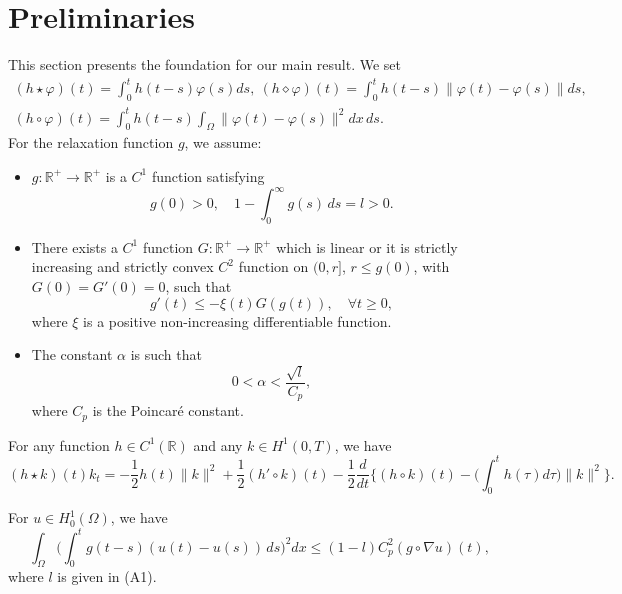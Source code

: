 \documentclass[reqno]{amsart}
\begin{document}
 \section{Preliminaries}

 This section presents the foundation for our main result. We set
 \begin{gather*}
 (h \star \varphi)(t) = \int_0^t h(t-s) \varphi(s)ds,\
 (h \diamond \varphi)(t) = \int_0^t h(t-s)\| \varphi(t)- \varphi(s)\| ds, \\
 (h \circ \varphi)(t) = \int_0^t h(t-s)\int_\Omega\| \varphi(t)- \varphi(s)\|^2 dx \, ds.
 \end{gather*}
 For the relaxation function $g$, we assume:
 \begin{itemize}
\item[(A1)] $g: \mathbb{R}^+ \to \mathbb{R}^+ $ is a $ C^1$ function satisfying\\
\begin{equation*}
 g(0) > 0, \quad 1-\int_0^{\infty} g(s) \, ds = l > 0. \label{e2.1}
\end{equation*}

\item[(A2)] There exists a $C^1$ function $G :\mathbb{R}^+ \to \mathbb{R}^+ $
which is linear or it is strictly increasing and strictly convex $C^2$ function on
$(0, r]$, $r \leq g(0)$, with $G(0) = G'(0) = 0$, such that
\begin{equation} \label{e2.2}
g'(t) \leq -\xi(t) G(g(t)),\quad \forall t \geq 0,
\end{equation}
where $\xi$ is a positive non-increasing differentiable function.

\item[(A3)] The constant $\alpha $ is such that
\begin{equation} \label{e2.3}
0 < \alpha < \frac{\sqrt{l} }{C_p},
\end{equation}
where $C_p$ is the Poincar\'e constant.
\end{itemize}

\begin{lemma} \label{lem1}
For any function $h \in C^1 (\mathbb{R})$ and any $k \in H^1 (0,T)$, we have
$$
(h \star k)(t) k_t
 = -\frac{1}{2} h(t)  \| k\|^2 + \frac{1}{2} (h' \circ k)(t)
 -\frac{1}{2} \frac{d}{dt} \Big\{( h \circ k)(t)
 - \Big( \int_0^t h(\tau) d\tau \Big) \|k\|^2 \Big\}.
$$
\end{lemma}

\begin{lemma} \label{lem2}
 For $u \in H^1_0(\Omega)$, we have
\begin{equation}
\int_\Omega \Big( \int_0^t g(t - s)(u(t) - u(s)) \, ds \Big)^2 dx
\leq (1 - l) C_p^2 (g \circ \nabla u)(t),\label{e2.4}
\end{equation}
where $l$ is given in {\rm (A1)}.
\end{lemma}
\end{document}
